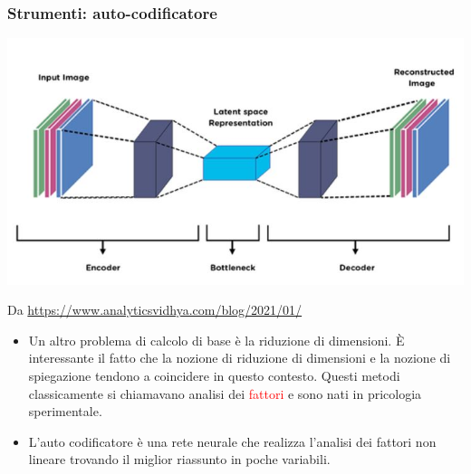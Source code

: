 \documentclass[xcolor=svgnames]{beamer}
\newcommand{\rosso}[1]{\textcolor{red}{#1}}
\renewcommand{\emph}{\rosso}
\begin{document}
\begin{frame}\small\frametitle{Strumenti: auto-codificatore}

  \begin{center}
    \includegraphics[height=.4\textheight]{pictures/autoencoder.jpeg}
  \end{center}

  {\tiny Da \url{https://www.analyticsvidhya.com/blog/2021/01/}}
  
  \begin{itemize}
  \item Un altro problema di calcolo di base è la riduzione di dimensioni. \`E interessante il fatto che la nozione di riduzione di dimensioni e la nozione di spiegazione tendono a coincidere in questo contesto. Questi metodi classicamente si chiamavano analisi dei \emph{fattori} e sono nati in pricologia sperimentale.
    \item L'auto codificatore è una rete neurale che realizza l'analisi dei fattori non lineare trovando il miglior riassunto in poche variabili.
  \end{itemize}
\end{frame}
\end{document}
